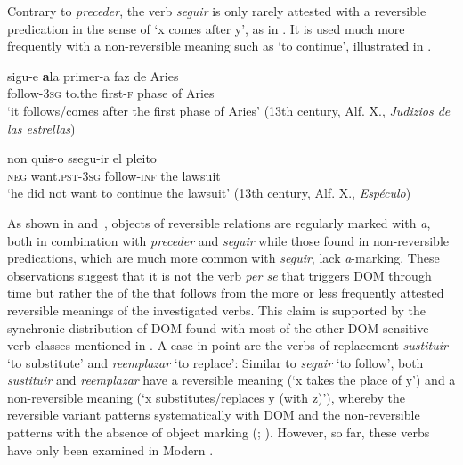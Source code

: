 \documentclass[output=paper]{LSP/langsci}
\begin{document}
Contrary to \textit{preceder}, the verb \textit{seguir} is only rarely attested with a reversible predication in the sense of ‘x comes after y’, as in . It is used much more frequently with a non-reversible meaning such as ‘to continue’, illustrated in .

\begin{exe}
\ex \label{08-ga-ex:23}%
\ea \label{08-ga-ex:23a}
\gll sigu-e \textbf{a}la primer-a faz de Aries\\
follow-3\textsc{sg} to.the first-\textsc{f} phase of Aries\\
\glt ‘it follows/comes after the first phase of Aries’
(13th century, Alf. X., \textit{Judizios de las estrellas})

\ex \label{08-ga-ex:23b}
\gll non quis-o ssegu-ir el pleito\\
 \textsc{neg} want.\textsc{pst-3sg} follow-\textsc{inf} the lawsuit\\
\glt ‘he did not want to continue the lawsuit’
 (13th century, Alf. X., \textit{Espéculo})
\z
\end{exe}

As shown in  and~,  objects of reversible relations are regularly marked with \textit{a}, both in combination with \textit{preceder} and \textit{seguir} while those found in non-reversible predications, which are much more common with \textit{seguir}, lack \textit{a}-marking. These observations suggest that it is not the verb \textit{per se} that triggers DOM through time but rather the  of the  that follows from the more or less frequently attested reversible meanings of the investigated verbs. This claim is supported by the synchronic distribution of DOM found with most of the other DOM-sensitive verb classes mentioned in . A case in point are the verbs of replacement \textit{sustituir} ‘to substitute’ and \textit{reemplazar} ‘to replace’: Similar to \textit{seguir} ‘to follow’, both \textit{sustituir} and \textit{reemplazar} have a reversible meaning (‘x takes the place of y’) and a non-reversible meaning (‘x substitutes/replaces y (with z)’), whereby the reversible variant patterns systematically with DOM and the non-reversible patterns with the absence of object marking (\cf \citealt[395--396]{Weissenrieder1985Exceptional}; \citealt[149--154]{GarciaGarcia2014Objektmarkierung}). However, so far, these verbs have only been examined in Modern . 
\end{document}
